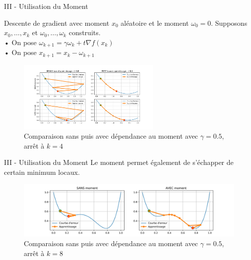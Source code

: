 \documentclass[10pt]{beamer}
\begin{document}
\begin{frame}{III - Utilisation du Moment}
\begin{block}{Descente de gradient avec moment}
$x_0$ aléatoire et le moment $\omega_0 = 0$.
Supposons $x_0, \ldots, x_k$ et $\omega_0, \ldots, \omega_k$ construits. \\
    • On pose $\omega_{k+1} = \gamma \omega_k + t \nabla f(x_k)$ \\
    • On pose $x_{k+1} = x_k - \omega_{k+1}$ 
\end{block}
\begin{figure}
	\centering
    \includegraphics[height=130px, trim=0 35 0 35, clip]{3-Moment.jpg}
	\caption{Comparaison sans puis avec dépendance au moment avec $\gamma = 0.5$, arrêt à $k=4$}
\end{figure}
\end{frame}

\begin{frame}{III - Utilisation du Moment}
Le moment permet également de s'échapper de certain minimum locaux.
\begin{figure}
	\centering
    \includegraphics[width=\paperwidth, trim=0 10 0 10, clip]{4-Moment.jpg}
	\caption{Comparaison sans puis avec dépendance au moment avec $\gamma = 0.5$, arrêt à $k=8$}
\end{figure}
\end{frame}
\end{document}
